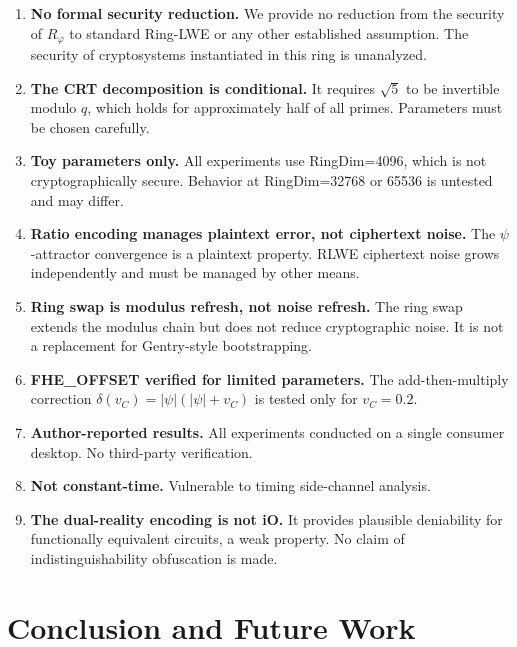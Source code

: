 \documentclass[11pt,a4paper]{article}
\begin{document}
\begin{enumerate}
    \item \textbf{No formal security reduction.} We provide no reduction from the security of $R_\varphi$ to standard Ring-LWE or any other established assumption. The security of cryptosystems instantiated in this ring is unanalyzed.

    \item \textbf{The CRT decomposition is conditional.} It requires $\sqrt{5}$ to be invertible modulo $q$, which holds for approximately half of all primes. Parameters must be chosen carefully.

    \item \textbf{Toy parameters only.} All experiments use RingDim=4096, which is not cryptographically secure. Behavior at RingDim=32768 or 65536 is untested and may differ.

    \item \textbf{Ratio encoding manages plaintext error, not ciphertext noise.} The $\psi$-attractor convergence is a plaintext property. RLWE ciphertext noise grows independently and must be managed by other means.

    \item \textbf{Ring swap is modulus refresh, not noise refresh.} The ring swap extends the modulus chain but does not reduce cryptographic noise. It is not a replacement for Gentry-style bootstrapping.

    \item \textbf{FHE\_OFFSET verified for limited parameters.} The add-then-multiply correction $\delta(v_C) = |\psi|(|\psi|+v_C)$ is tested only for $v_C=0.2$.

    \item \textbf{Author-reported results.} All experiments conducted on a single consumer desktop. No third-party verification.

    \item \textbf{Not constant-time.} Vulnerable to timing side-channel analysis.

    \item \textbf{The dual-reality encoding is not iO.} It provides plausible deniability for functionally equivalent circuits, a weak property. No claim of indistinguishability obfuscation is made.
\end{enumerate}

\section{Conclusion and Future Work}
\end{document}
